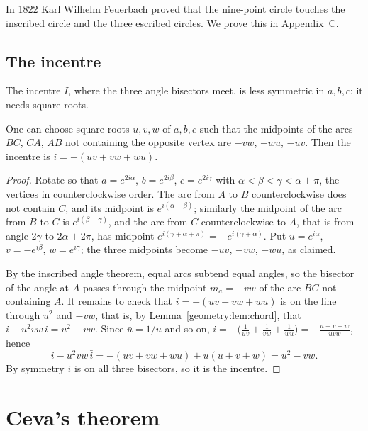 \begin{remark}
In 1822 Karl Wilhelm Feuerbach proved that the nine-point circle touches the inscribed circle and the three escribed circles. We prove
this in Appendix~C.
\end{remark}

\subsection*{The incentre}

The incentre $I$, where the three angle bisectors meet, is less symmetric in $a,b,c$: it needs square roots.

\begin{proposition}\label{geometry:prop:incentre}
One can choose square roots $u,v,w$ of $a,b,c$ such that the midpoints of the arcs $BC$, $CA$, $AB$ not containing the opposite vertex are
$-vw$, $-wu$, $-uv$. Then the incentre is $i=-(uv+vw+wu)$.
\end{proposition}
\begin{proof}
Rotate so that $a=e^{2i\alpha}$, $b=e^{2i\beta}$, $c=e^{2i\gamma}$ with $\alpha<\beta<\gamma<\alpha+\pi$, the vertices in counterclockwise
order. The arc from $A$ to $B$ counterclockwise does not contain $C$, and its midpoint is $e^{i(\alpha+\beta)}$; similarly the
midpoint of the arc from $B$ to $C$ is $e^{i(\beta+\gamma)}$, and the arc from $C$ counterclockwise to $A$, that is from angle $2\gamma$
to $2\alpha+2\pi$, has midpoint $e^{i(\gamma+\alpha+\pi)}=-e^{i(\gamma+\alpha)}$. Put $u=e^{i\alpha}$, $v=-e^{i\beta}$, $w=e^{i\gamma}$; the three
midpoints become $-uv$, $-vw$, $-wu$, as claimed.

By the inscribed angle theorem, equal arcs subtend equal angles, so the bisector of the angle at $A$ passes through the midpoint $m_a=-vw$
of the arc $BC$ not containing $A$. It remains to check that $i=-(uv+vw+wu)$ is on the line through $u^2$ and $-vw$, that is, by
Lemma~\ref{geometry:lem:chord}, that $i-u^2vw\,\bar i=u^2-vw$. Since $\bar u=1/u$ and so on, $\bar i=-\bigl(\frac1{uv}+\frac1{vw}+\frac1{wu}\bigr)
=-\frac{u+v+w}{uvw}$, hence
\[
i-u^2vw\,\bar i=-(uv+vw+wu)+u(u+v+w)=u^2-vw .
\]
By symmetry $i$ is on all three bisectors, so it is the incentre.
\end{proof}

\section{Ceva's theorem}

